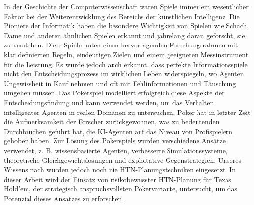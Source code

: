 In der Geschichte der Computerwissenschaft waren Spiele immer ein wesentlicher Faktor bei der Weiterentwicklung des Bereichs der künstlichen Intelligenz. Die Pioniere der Informatik haben die besondere Wichtigkeit von Spielen wie Schach, Dame und anderen ähnlichen Spielen erkannt und jahrelang daran geforscht, sie zu verstehen. Diese Spiele boten einen hervorragenden Forschungsrahmen mit klar definierten Regeln, eindeutigen Zielen und einem geeigneten Messinstrument für die Leistung. Es wurde jedoch auch erkannt, dass perfekte Informationsspiele nicht den Entscheidungsprozess im wirklichen Leben widerspiegeln, wo Agenten Ungewissheit in Kauf nehmen und oft mit Fehlinformationen und Täuschung umgehen müssen. Das Pokerspiel modelliert erfolgreich diese Aspekte der Entscheidungsfindung und kann verwendet werden, um das Verhalten intelligenter Agenten in realen Domänen zu untersuchen. Poker hat in letzter Zeit die Aufmerksamkeit der Forscher zurückgewonnen, was zu bedeutenden Durchbrüchen geführt hat, die KI-Agenten auf das Niveau von Profispielern gehoben haben. Zur Lösung des Pokerspiels wurden verschiedene Ansätze verwendet, z. B. wissensbasierte Agenten, verbesserte Simulationssysteme, theoretische Gleichgewichtslösungen und exploitative Gegenstrategien. Unseres Wissens nach wurden jedoch noch nie HTN-Planungstechniken eingesetzt. In dieser Arbeit wird der Einsatz von risikobewusster HTN-Planung für Texas Hold'em, der strategisch anspruchsvollsten Pokervariante, untersucht, um das Potenzial dieses Ansatzes zu erforschen.